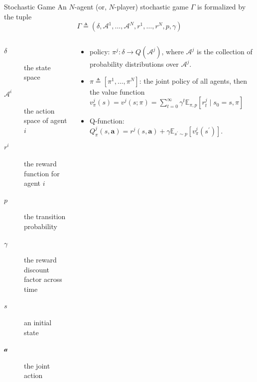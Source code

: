 \begin{frame}{Stochastic Game}
	An $N$-agent (or, $N$-player) stochastic game $\Gamma$ is formalized
	by the tuple
	$$\Gamma \triangleq\left(\delta, \mathscr{A}^{1}, \ldots, \mathscr{A}^{N}, r^{1}, \ldots, r^{N}, p, \gamma\right)$$
	
	\pause
	\begin{columns}[c]
		\begin{column}{0.5\textwidth}
			\begin{description} 
				\item[$\delta$] the state space
				\item[$\mathscr{A}^{i}$] the action space of agent $i$
				\item[$r^{i}$] the reward function for agent $i$
				\item[$p$] the transition probability
				\item[$\gamma$] the
				reward discount factor across time
				\item[$s$] an initial state
				\item[$\mathscr{a}$] the joint action
			\end{description}
		\end{column}
	
		\vrule{}
		\begin{column}{0.5\textwidth}
			\begin{itemize}
				\item policy: $\pi^{j}:\delta \mathcal{\rightarrow} Q\left(\mathscr{A}^{j}\right)$, where $\mathscr{A}^{j}$ is the collection of probability distributions over $\mathscr{A}^{j}$.
				\item $\pi \triangleq\left[\pi^{1}, \ldots, \pi^{N}\right]$: the joint policy of all agents, then the value function
				$v_{\pi}^{j}(s)=v^{j}(s ; \pi)=\sum_{t=0}^{\infty} \gamma^{t} \mathbb{E}_{\pi, p}\left[r_{t}^{j} \mid s_{0}=s, \pi\right]$
				\item Q-function: $Q_{\pi}^{j}(s, \boldsymbol{a})=r^{j}(s, \boldsymbol{a})+\gamma \mathbb{E}_{s^{\prime} \sim p}\left[v_{\pi}^{j}\left(s^{\prime}\right)\right]$.
			\end{itemize}
		\end{column}
	\end{columns}
\end{frame}

